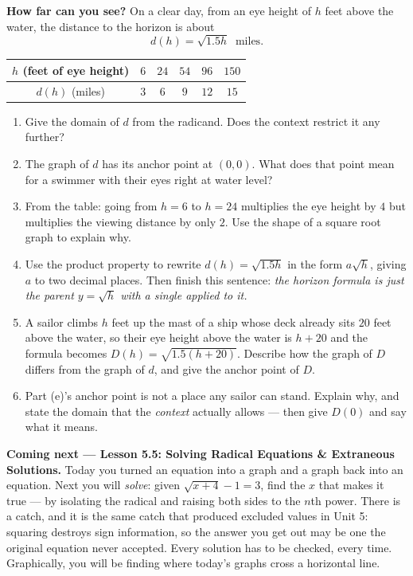 \documentclass[10pt]{article}
\begin{document}
\begin{extensionbox}
\textbf{How far can you see?} On a clear day, from an eye height of $h$ feet above the water, the
distance to the horizon is about
\[
  d(h) = \sqrt{1.5h} \ \text{ miles.}
\]
\begin{center}
\renewcommand{\arraystretch}{1.25}
\begin{tabular}{|c|c|c|c|c|c|}
\hline
$h$ (feet of eye height) & $6$ & $24$ & $54$ & $96$ & $150$ \\ \hline
$d(h)$ (miles) & $3$ & $6$ & $9$ & $12$ & $15$ \\ \hline
\end{tabular}
\end{center}
\begin{enumerate}[label=(\alph*), leftmargin=1.8em, itemsep=5pt]
  \item Give the domain of $d$ from the radicand. Does the context restrict it any further?
  \item The graph of $d$ has its anchor point at $(0,0)$. What does that point mean for a swimmer
        with their eyes right at water level?
  \item From the table: going from $h=6$ to $h=24$ multiplies the eye height by $4$ but multiplies
        the viewing distance by only $2$. Use the shape of a square root graph to explain why.
  \item Use the product property to rewrite $d(h)=\sqrt{1.5h}$ in the form $a\sqrt{h}$, giving $a$ to
        two decimal places. Then finish this sentence: \emph{the horizon formula is just the parent
        $y=\sqrt{h}$ with a single \underline{\hspace{2.4cm}} applied to it.}
  \item A sailor climbs $h$ feet up the mast of a ship whose deck already sits $20$ feet above the
        water, so their eye height above the water is $h+20$ and the formula becomes
        $D(h)=\sqrt{1.5(h+20)}$. Describe how the graph of $D$ differs from the graph of $d$, and
        give the anchor point of $D$.
  \item Part (e)'s anchor point is not a place any sailor can stand. Explain why, and state the
        domain that the \emph{context} actually allows --- then give $D(0)$ and say what it means.
\end{enumerate}
\end{extensionbox}

\begin{spiralbox}
\textbf{Coming next --- Lesson 5.5: Solving Radical Equations \& Extraneous Solutions.} Today you
turned an equation into a graph and a graph back into an equation. Next you will \emph{solve}: given
$\sqrt{x+4}-1=3$, find the $x$ that makes it true --- by isolating the radical and raising both sides
to the $n$th power. There is a catch, and it is the same catch that produced excluded values in Unit
5: squaring destroys sign information, so the answer you get out may be one the original equation
never accepted. Every solution has to be checked, every time. Graphically, you will be finding where
today's graphs cross a horizontal line.
\end{spiralbox}
\end{document}
